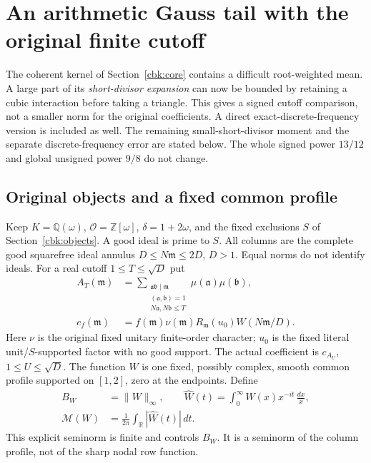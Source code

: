 \section{An arithmetic Gauss tail with the original finite cutoff}
\label{gtl:core}
The coherent kernel of Section~\ref{cbk:core} contains a difficult
root-weighted mean. A large part of its \emph{short-divisor expansion}
can now be bounded by retaining a cubic interaction before taking a
triangle. This gives a signed cutoff comparison, not a smaller norm
for the original coefficients. A direct exact-discrete-frequency
version is included as well. The remaining small-short-divisor
moment and the separate discrete-frequency error are stated below.
The whole signed power $13/12$ and global unsigned power $9/8$ do not
change.

\subsection{Original objects and a fixed common profile}
\label{gtl:objects}
Keep $K=\mathbb Q(\omega)$, $\mathcal O=\mathbb Z[\omega]$,
$\delta=1+2\omega$, and the fixed exclusions $S$ of
Section~\ref{cbk:objects}. A good ideal is prime to $S$.
All columns are the complete good squarefree ideal annulus
$D\le N\mathfrak m\le2D$, $D>1$. Equal norms do not identify ideals.
For a real cutoff $1\le T\le\sqrt D$ put
\begin{equation}\label{gtl:coefficients}
 \begin{aligned}
 A_T(\mathfrak m)
 &=\sum_{\substack{\mathfrak a\mathfrak b\mid\mathfrak m\\
             (\mathfrak a,\mathfrak b)=1\\
             N\mathfrak a,N\mathfrak b\le T}}
                    \mu(\mathfrak a)\mu(\mathfrak b),\\
 c_f(\mathfrak m)
 &=f(\mathfrak m)\nu(\mathfrak m)R_{\mathfrak m}(u_0)
                                             W(N\mathfrak m/D).
 \end{aligned}
\end{equation}
Here $\nu$ is the original fixed unitary finite-order character;
$u_0$ is the fixed literal unit/$S$-supported factor with no good
support. The actual coefficient is $c_{A_U}$, $1\le U\le\sqrt D$.
The function $W$ is one fixed, possibly complex, smooth common
profile supported on $[1,2]$, zero at the endpoints. Define
\begin{equation}\label{gtl:profile}
 \begin{aligned}
 B_W&=\|W\|_\infty,\qquad
 \widehat W(t)=\int_0^\infty W(x)x^{-it}\,\frac{dx}{x},\\
 \mathcal M(W)&=\frac1{2\pi}\int_{\mathbb R}|\widehat W(t)|\,dt.
 \end{aligned}
\end{equation}
This explicit seminorm is finite and controls $B_W$. It is a
seminorm of the column profile, not of the sharp nodal row function.

